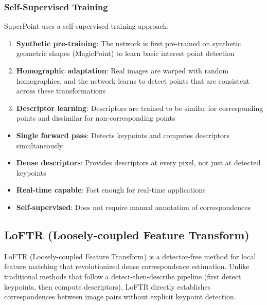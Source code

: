 \documentclass[11pt,a4paper]{article}
\theoremstyle{definition}
\theoremstyle{plain}
\theoremstyle{remark}
\begin{document}
\subsubsection{Self-Supervised Training}

SuperPoint uses a self-supervised training approach:
\begin{enumerate}
    \item \textbf{Synthetic pre-training}: The network is first pre-trained on synthetic geometric shapes (MagicPoint) to learn basic interest point detection
    \item \textbf{Homographic adaptation}: Real images are warped with random homographies, and the network learns to detect points that are consistent across these transformations
    \item \textbf{Descriptor learning}: Descriptors are trained to be similar for corresponding points and dissimilar for non-corresponding points
\end{enumerate}

\begin{tcolorbox}[colback=green!5!white,colframe=green!75!black,title=\textbf{SuperPoint Key Features}]
\begin{itemize}
    \item \textbf{Single forward pass}: Detects keypoints and computes descriptors simultaneously
    \item \textbf{Dense descriptors}: Provides descriptors at every pixel, not just at detected keypoints
    \item \textbf{Real-time capable}: Fast enough for real-time applications
    \item \textbf{Self-supervised}: Does not require manual annotation of correspondences
\end{itemize}
\end{tcolorbox}

\subsection{LoFTR (Loosely-coupled Feature Transform)}

LoFTR (Loosely-coupled Feature Transform) is a detector-free method for local feature matching that revolutionized dense correspondence estimation. Unlike traditional methods that follow a detect-then-describe pipeline (first detect keypoints, then compute descriptors), LoFTR directly establishes correspondences between image pairs without explicit keypoint detection.
\end{document}
